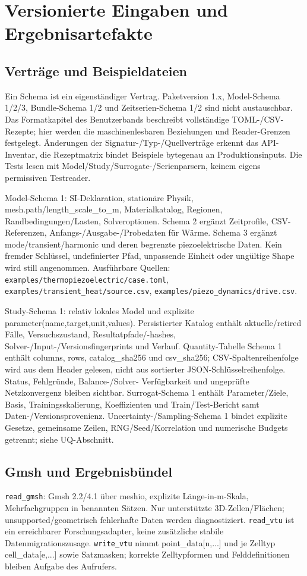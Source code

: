\chapter{Versionierte Eingaben und Ergebnisartefakte}
\label{api:artifacts}
\begingroup\raggedright
\section{Verträge und Beispieldateien}
Ein Schema ist ein eigenständiger Vertrag. Paketversion 1.x, Model-Schema 1/2/3,
Bundle-Schema 1/2 und Zeitserien-Schema 1/2 sind nicht austauschbar.
Das Formatkapitel des Benutzerbands beschreibt vollständige TOML-/CSV-Rezepte;
hier werden die maschinenlesbaren Beziehungen und Reader-Grenzen festgelegt.
Änderungen der Signatur-/Typ-/Quellverträge erkennt das API-Inventar, die
Rezeptmatrix bindet Beispiele bytegenau an Produktionsinputs. Die Tests lesen
mit Model/Study/Surrogate-/Serienparsern, keinem eigens permissiven Testreader.

Model-Schema 1: SI-Deklaration, stationäre Physik, mesh.path/length\_scale\_to\_m,
Materialkatalog, Regionen, Randbedingungen/Lasten, Solveroptionen.
Schema 2 ergänzt Zeitprofile, CSV-Referenzen, Anfangs-/Ausgabe-/Probedaten für
Wärme. Schema 3 ergänzt mode/transient/harmonic und deren begrenzte
piezoelektrische Daten. Kein fremder Schlüssel, undefinierter Pfad, unpassende
Einheit oder ungültige Shape wird still angenommen. Ausführbare Quellen:
\nolinkurl{examples/thermopiezoelectric/case.toml},
\nolinkurl{examples/transient_heat/source.csv},
\nolinkurl{examples/piezo_dynamics/drive.csv}.

Study-Schema 1: relativ lokales Model und explizite parameter(name,target,unit,values).
Persistierter Katalog enthält aktuelle/retired Fälle, Versuchszustand,
Resultatpfade/-hashes, Solver-/Input-/Versionsfingerprints und Verlauf.
Quantity-Tabelle Schema 1 enthält columns, rows, catalog\_sha256 und
csv\_sha256; CSV-Spaltenreihenfolge wird aus dem Header gelesen, nicht aus
sortierter JSON-Schlüsselreihenfolge. Status, Fehlgründe, Balance-/Solver-
Verfügbarkeit und ungeprüfte Netzkonvergenz bleiben sichtbar.
Surrogat-Schema 1 enthält Parameter/Ziele, Basis, Trainingsskalierung,
Koeffizienten und Train/Test-Bericht samt Daten-/Versionsprovenienz.
Uncertainty-/Sampling-Schema 1 bindet explizite Gesetze, gemeinsame Zeilen,
RNG/Seed/Korrelation und numerische Budgets getrennt; siehe UQ-Abschnitt.

\section{Gmsh und Ergebnisbündel}
\texttt{read\_gmsh}: Gmsh 2.2/4.1 über meshio, explizite Länge-in-m-Skala,
Mehrfachgruppen in benannten Sätzen. Nur unterstützte 3D-Zellen/Flächen;
unsupported/geometrisch fehlerhafte Daten werden diagnostiziert.
\texttt{read\_vtu} ist ein erreichbarer Forschungsadapter, keine zusätzliche
stabile Datenmigrationszusage. \texttt{write\_vtu} nimmt point\_data[n,...]
und je Zelltyp cell\_data[e,...] sowie Satzmasken; korrekte Zelltypformen
und Felddefinitionen bleiben Aufgabe des Aufrufers.

